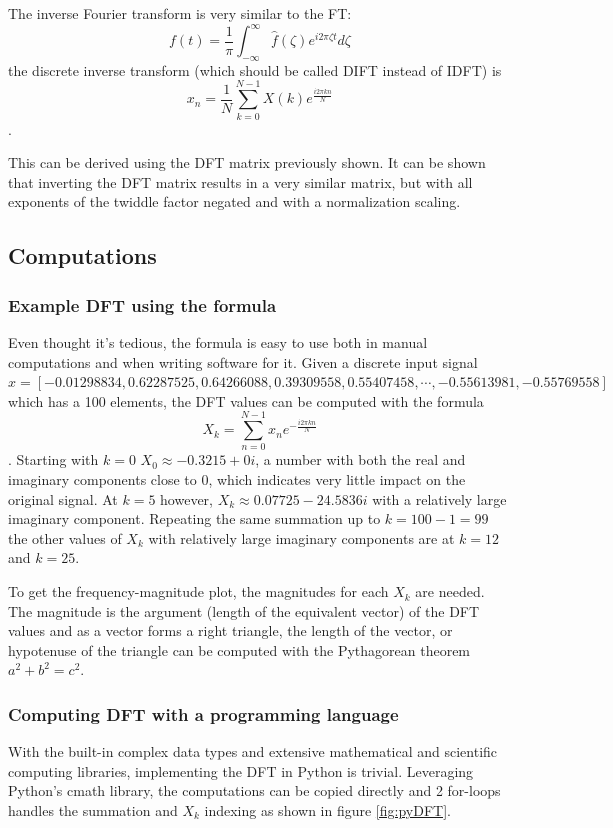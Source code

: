 The inverse Fourier transform is very similar to the FT:
$$ f(t) = \frac{1}{\pi}\int_{-\infty}^{\infty} \hat{f}(\zeta)e^{i2\pi\zeta t} d\zeta$$
the discrete inverse transform (which should be called DIFT instead of IDFT) is 
$$ x_n = \frac{1}{N}\sum_{k=0}^{N-1} X(k)e^{\frac{i2\pi kn}{N}}$$.

This can be derived using the DFT matrix previously shown. It can be shown that inverting the DFT matrix results in a very similar matrix, but with all exponents of the twiddle factor negated and with a normalization scaling. 

\subsection{Computations}
\subsubsection{Example DFT using the formula}
Even thought it's tedious, the formula is easy to use both in manual computations and when writing software for it. Given a discrete input signal $x = [-0.01298834,  0.62287525,  0.64266088,  0.39309558,  0.55407458, \cdots , -0.55613981, -0.55769558]$ which has a 100 elements, the DFT values can be computed with the formula $$X_k = \sum_{n=0}^{N-1} x_ne^{-\frac{i2\pi kn}{N}}$$. Starting with $k=0$ $X_0 \approx -0.3215+0i$, a number with both the real and imaginary components close to 0, which indicates very little impact on the original signal. At $k=5$ however, $X_k \approx 0.07725-24.5836i$ with a relatively large imaginary component. Repeating the same summation up to $k=100-1 = 99$ the other values of $X_k$ with relatively large imaginary components are at $k=12$ and $k=25$. 

To get the frequency-magnitude plot, the magnitudes for each $X_k$ are needed. The magnitude is the argument (length of the equivalent vector) of the DFT values and as a vector forms a right triangle, the length of the vector, or hypotenuse of the triangle can be computed with the Pythagorean theorem $a^2 + b^2 = c^2$. 


\subsubsection{Computing DFT with a programming language}
With the built-in complex data types and extensive mathematical and scientific computing libraries, implementing the DFT in Python is trivial. Leveraging Python's cmath library, the computations can be copied directly and 2 for-loops handles the summation and $X_k$ indexing as shown in figure \ref{fig:pyDFT}.

